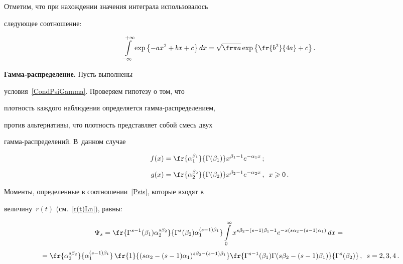 Отметим, что при нахождении значения интеграла использовалось

следующее соотношение:

$$

\int\limits_{-\infty}^{+\infty}

\exp{\left\{-ax^2+bx+c\right\}}\,dx=\sqrt{\fr\pi

a}\exp{\left\{\fr {b^2}{4a}+c\right\}}\,.

$$






\textbf{Гамма-распределение.} Пусть выполнены

условия~\eqref{CondPsiGamma}. Проверяем гипотезу о том, что

плот\-ность каждого наблюдения определяется гам\-ма-рас\-пре\-де\-ле\-ни\-ем,

против альтернативы, что плот\-ность представляет собой смесь двух

гамма-распределений. В~данном случае

\begin{align*}

f(x)&=\fr{\alpha_1^{\beta_1}}{\Gamma(\beta_1)}x^{\beta_1-1}e^{-\alpha_1x}\,;\\[6pt]

g(x)&=\fr{\alpha_2^{\beta_2}}{\Gamma(\beta_2)}x^{\beta_2-1}e^{-\alpha_2x}\,,\enskip x\geqslant0\,.

\end{align*}

Моменты, определенные в соотношении~\eqref{Psis}, которые входят в

величину~$r(t)$ (см.~\eqref{r(t)Ln}), равны:

\begin{multline*}

\Psi_s=\fr{\Gamma^{s-1}(\beta_1)\alpha_2^{s\beta_2}}{\Gamma^s(\beta_2)\alpha_1^{(s-1)\beta_1}}

\int\limits_0^\infty x^{s\beta_2-(s-1)\beta_1-1}e^{-x(s\alpha_2-(s-1)\alpha_1)}\,dx={}\\[3pt]

{}=\fr{\alpha_2^{s\beta_2}}{\alpha_1^{(s-1)\beta_1}}\,

\fr{1}{(s\alpha_2-(s-1)\alpha_1)^{s\beta_2-(s-1)\beta_1}}

\fr{\Gamma^{s-1}(\beta_1)\Gamma(s\beta_2-(s-1)\beta_1)}{\Gamma^s(\beta_2)}\,,\enskip

s=2,3,4\,.

\end{multline*}



